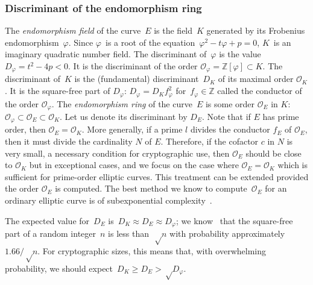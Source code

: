 \documentclass[twocolumn,letterpaper]{article}
\let\ro\mathcal
\begin{document}
\subsubsection{Discriminant of the endomorphism ring}
\label{sss:discriminant}



The \emph{endomorphism field} of the curve~$E$
is the field~$K$ generated by its Frobenius endomorphism~$φ$.
Since $φ$~is a root of the equation~$φ^2 - t φ + p = 0$,
$K$~is an imaginary quadratic number field.
The discriminant of~$φ$ is the value~$D_φ = t^2 - 4 p < 0$.
It is the discriminant of the order $\ro O_φ = ℤ[φ] \subset K$.
The discriminant of~$K$ is the (fundamental) discriminant~$D_K$ of its
maximal order $\ro O_K$.
It is the square-free part of $D_φ$: $D_φ = D_K f_φ^2$ for~$f_φ ∈ ℤ$
called the conductor of the order $\ro O_φ$.
The \emph{endomorphism ring} of the curve~$E$ is some order $\ro O_E$ in $K$:
$\ro O_φ \subset \ro O_E \subset \ro O_K$.
Let us denote its discriminant by $D_E$.
Note that if $E$ has prime order, then $\ro O_E = \ro O_K$.
More generally, if a prime $l$ divides the conductor $f_E$ of $\ro O_E$,
then it must divide the cardinality $N$ of $E$.
Therefore, if the cofactor $c$ in $N$ is very small, a necessary condition for
cryptographic use, then $\ro O_E$ should be close to $\ro O_K$ but
in exceptional cases, and we focus on the case where $\ro O_E = \ro O_K$
which is sufficient for prime-order elliptic curves.
This treatment can be extended provided the order $\ro O_E$ is computed.
The best method we know to compute~$\ro O_E$ for an ordinary elliptic curve
is of subexponential complexity~\cite{jmc2012bisson}.

The expected value for~$D_E$ is~$D_K ≈ D_E ≈ D_φ$;
we know~\cite{jis2014cdkd} that the square-free part of
a random integer~$n$ is less than~$√n$
with probability approximately~$1.66/√n$.
For cryptographic sizes, this means that,
with overwhelming probability, we should expect~$D_K \geq D_E > √{D_φ}$.
\end{document}
